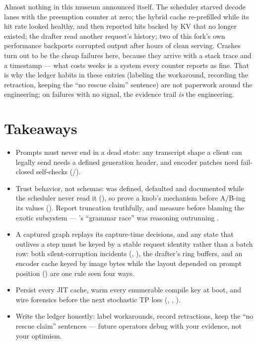 Almost nothing in this museum announced itself. The scheduler starved decode
lanes with the preemption counter at zero; the hybrid cache re-prefilled
while its hit rate looked healthy, and then reported hits backed by KV that
no longer existed; the drafter read another request's history; two of this
fork's own performance backports corrupted output after hours of clean
serving. Crashes turn out to be the cheap failures here, because they arrive
with a stack trace and a timestamp --- what costs weeks is a system every
counter reports as fine. That is why the ledger habits in these entries
(labeling the workaround, recording the retraction, keeping the ``no rescue
claim'' sentence) are not paperwork around the engineering; on failures with
no signal, the evidence trail \emph{is} the engineering.

\FloatBarrier
\section*{Takeaways}

\begin{itemize}
  \item Prompts must never end in a dead state: any transcript shape a
    client can legally send needs a defined generation header, and encoder
    patches need fail-closed self-checks (/).
  \item Trust behavior, not schemas:  was
    defined, defaulted and documented while the scheduler never read it
    (), so prove a knob's mechanism before A/B-ing its values
    (). Report truncation truthfully, and measure before blaming
    the exotic subsystem --- 's ``grammar race'' was reasoning
    outrunning .
  \item A captured graph replays its capture-time decisions, and any state
    that outlives a step must be keyed by a stable request identity rather
    than a batch row: both silent-corruption incidents
    (, ), the drafter's ring buffers, and an
    encoder cache keyed by image bytes while the layout depended on prompt
    position () are one rule seen four ways.
  \item Persist every JIT cache, warm every enumerable compile key at boot,
    and wire forensics before the next stochastic TP loss (,
    , ).
  \item Write the ledger honestly: label workarounds, record retractions,
    keep the ``no rescue claim'' sentences --- future operators debug with
    your evidence, not your optimism.
\end{itemize}

